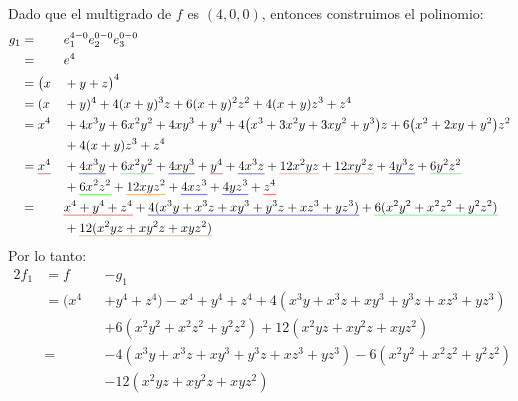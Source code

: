 \begin{solucion}
    Dado que el multigrado de $f$ es $(4,0,0)$,  entonces construimos el polinomio:
    \begin{alignat*}{2}
      g_1 &=&&e_1^{4-0}e_2^{0-0}e_3^{0-0}\\
        &=&&e^{4}\\
        &=\bigl(x&&+y+z\bigr)^{4}\\
        &=(x&&+y)^4+4(x+y)^3z + 6(x+y)^2z^2 + 4(x+y)z^3 + z^4\\
        &=x^{4} &&+4x^{3}y + 6x^{2}y^{2} + 4xy^{3}+ y^4 + 4\bigl(x^{3}+3x^{2}y+3xy^{2}+y^{3}\bigr)z + 6\bigl(x^{2}+2xy+y^{2}\bigr)z^{2} \\
        &\phantom{=}&&+ 4(x+y)z^{3} + z^{4}\\
    &=\text{\setulcolor{red}\ul{$x^{4}$}}
      &&+\text{\setulcolor{blue}\ul{$4x^{3}y$}}
       +\text{\setulcolor{green}\ul{$6x^{2}y^{2}$}}
       +\text{\setulcolor{blue}\ul{$4xy^{3}$}}
       +\text{\setulcolor{red}\ul{$y^{4}$}}+\text{\setulcolor{blue}\ul{$4x^{3}z$}}
       +\text{\setulcolor{orange}\ul{$12x^{2}yz$}}
       +\text{\setulcolor{orange}\ul{$12xy^{2}z$}}
       +\text{\setulcolor{blue}\ul{$4y^{3}z$}}
       +\text{\setulcolor{green}\ul{$6y^{2}z^{2}$}} \\
    &\phantom{=}&&+\text{\setulcolor{green}\ul{$6x^{2}z^{2}$}}
       +\text{\setulcolor{orange}\ul{$12xyz^{2}$}}
       +\text{\setulcolor{blue}\ul{$4xz^{3}$}}
       +\text{\setulcolor{blue}\ul{$4yz^{3}$}}
       +\text{\setulcolor{red}\ul{$z^{4}$}} \\
    &=&&\text{\setulcolor{red}\ul{$x^{4} + y^{4} + z^{4}$}}
      +\text{\setulcolor{blue}\ul{$4(x^{3}y + x^{3}z + xy^{3} + y^{3}z + xz^{3} + yz^{3})$}}
       +\text{\setulcolor{green}\ul{$6(x^{2}y^{2} + x^{2}z^{2} + y^{2}z^{2})$}} \\
    &\phantom{=}&&+\text{\setulcolor{orange}\ul{$12(x^{2}yz + xy^{2}z + xyz^{2})$}} \\
    \end{alignat*}
    Por lo tanto:
    \begin{alignat*}{2}
        f_{1}&=f&&-g_1\\
        &=(x^{4}&&+y^{4}+z^{4})-x^{4} + y^{4} + z^{4}
        +4(x^{3}y + x^{3}z + xy^{3} + y^{3}z + xz^{3} + yz^{3})\\
        &\phantom{=}&&+6(x^{2}y^{2} + x^{2}z^{2} + y^{2}z^{2}) +12(x^{2}yz + xy^{2}z + xyz^{2}) \\
        &=&&-4(x^{3}y + x^{3}z + xy^{3} + y^{3}z + xz^{3} + yz^{3})-6(x^{2}y^{2} + x^{2}z^{2} + y^{2}z^{2})\\
        & &&-12(x^{2}yz + xy^{2}z + xyz^{2}) \\
    \end{alignat*}


\end{solucion}

